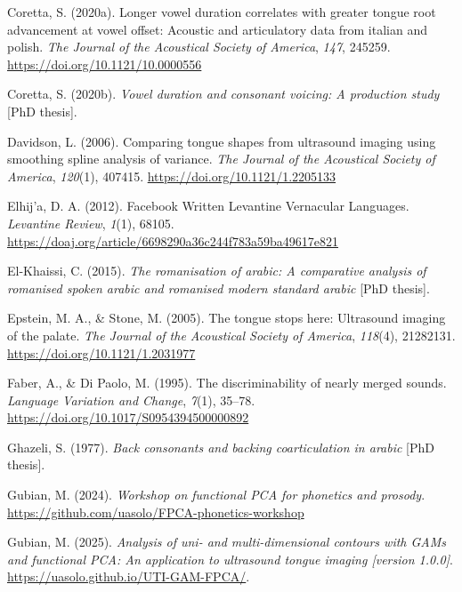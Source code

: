 \documentclass[
  man,
  longtable,
  nolmodern,
  notxfonts,
  notimes,
  colorlinks=true,linkcolor=blue,citecolor=blue,urlcolor=blue]{apa7}
\newlength{\cslhangindent}
\newenvironment{CSLReferences}[2] %
 {\begin{list}{}{%
  \setlength{\itemindent}{0pt}
  \setlength{\leftmargin}{0pt}
  \setlength{\parsep}{0pt}
  \ifodd #1
   \setlength{\leftmargin}{\cslhangindent}
   \setlength{\itemindent}{-1\cslhangindent}
  \fi
  \setlength{\itemsep}{#2\baselineskip}}}
 {\end{list}}
\begin{document}
\begin{CSLReferences}{1}{0}
Coretta, S. (2020a). Longer vowel duration correlates with greater
tongue root advancement at vowel offset: Acoustic and articulatory data
from italian and polish. \emph{The Journal of the Acoustical Society of
America}, \emph{147}, 245259. \url{https://doi.org/10.1121/10.0000556}

Coretta, S. (2020b). \emph{Vowel duration and consonant voicing: A
production study} {[}PhD thesis{]}.

Davidson, L. (2006). Comparing tongue shapes from ultrasound imaging
using smoothing spline analysis of variance. \emph{The Journal of the
Acoustical Society of America}, \emph{120}(1), 407415.
\url{https://doi.org/10.1121/1.2205133}

Elhij'a, D. A. (2012). Facebook Written Levantine Vernacular Languages.
\emph{Levantine Review}, \emph{1}(1), 68105.
\url{https://doaj.org/article/6698290a36c244f783a59ba49617e821}

El-Khaissi, C. (2015). \emph{The romanisation of arabic: A comparative
analysis of romanised spoken arabic and romanised modern standard
arabic} {[}PhD thesis{]}.

Epstein, M. A., \& Stone, M. (2005). The tongue stops here: Ultrasound
imaging of the palate. \emph{The Journal of the Acoustical Society of
America}, \emph{118}(4), 21282131.
\url{https://doi.org/10.1121/1.2031977}

Faber, A., \& Di Paolo, M. (1995). The discriminability of nearly merged
sounds. \emph{Language Variation and Change}, \emph{7}(1), 35--78.
\url{https://doi.org/10.1017/S0954394500000892}

Ghazeli, S. (1977). \emph{Back consonants and backing coarticulation in
arabic} {[}PhD thesis{]}.

Gubian, M. (2024). \emph{Workshop on functional PCA for phonetics and
prosody}. \url{https://github.com/uasolo/FPCA-phonetics-workshop}

Gubian, M. (2025). \emph{Analysis of uni- and multi-dimensional contours
with {GAMs} and functional {PCA}: An application to ultrasound tongue
imaging {[}version 1.0.0{]}}.
\url{https://uasolo.github.io/UTI-GAM-FPCA/}.


\end{CSLReferences}
\end{document}
